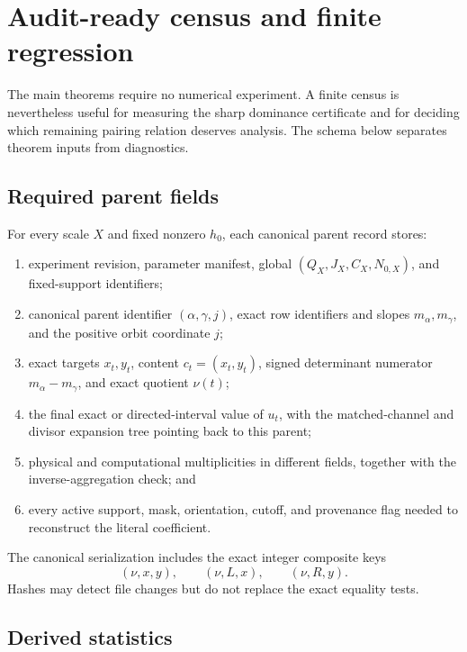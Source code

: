 \section{Audit-ready census and finite regression}
\label{sec:regression-schema}

The main theorems require no numerical experiment.  A finite census is
nevertheless useful for measuring the sharp dominance certificate and
for deciding which remaining pairing relation deserves analysis.  The
schema below separates theorem inputs from diagnostics.

\subsection{Required parent fields}

For every scale \(X\) and fixed nonzero \(h_0\), each canonical parent
record stores:

\begin{enumerate}[leftmargin=2.2em]
\item experiment revision, parameter manifest, global
  \((Q_X,J_X,C_X,N_{0,X})\), and fixed-support identifiers;
\item canonical parent identifier \((\alpha,\gamma,j)\), exact row
  identifiers and slopes \(m_\alpha,m_\gamma\), and the positive orbit
  coordinate \(j\);
\item exact targets \(x_t,y_t\), content \(c_t=(x_t,y_t)\), signed
  determinant numerator \(m_\alpha-m_\gamma\), and exact quotient
  \(\nu(t)\);
\item the final exact or directed-interval value of \(u_t\), with the
  matched-channel and divisor expansion tree pointing back to this
  parent;
\item physical and computational multiplicities in different fields,
  together with the inverse-aggregation check; and
\item every active support, mask, orientation, cutoff, and provenance
  flag needed to reconstruct the literal coefficient.
\end{enumerate}

The canonical serialization includes the exact integer composite keys
\[
 (\nu,x,y),\qquad(\nu,L,x),\qquad(\nu,R,y).
\]
Hashes may detect file changes but do not replace the exact equality
tests.

\subsection{Derived statistics}

